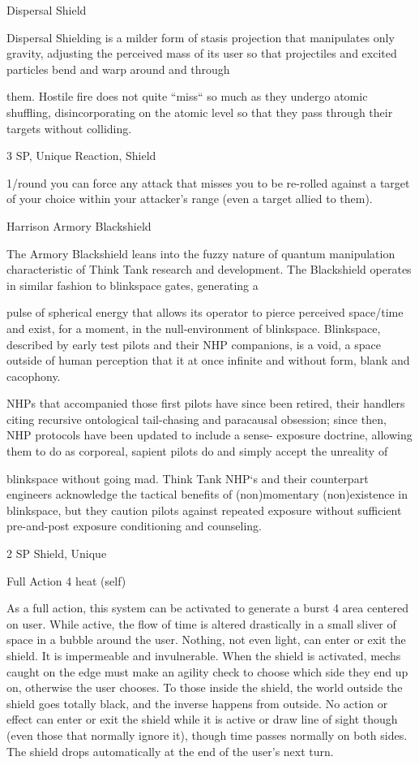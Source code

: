 Dispersal Shield  

Dispersal Shielding is a milder form of stasis projection that manipulates only gravity, adjusting the  
perceived mass of its user so that projectiles and excited particles bend and warp around and through  

                                                                                                                    


them. Hostile fire does not quite “miss“ so much as they undergo atomic shuffling, disincorporating on the  
atomic level so that they pass through their targets without colliding.   

3 SP, Unique  
Reaction, Shield
 
1/round you can force any attack that misses you to be re-rolled against a target of your choice  
within your attacker’s range (even a target allied to them).
 

Harrison Armory Blackshield  

The Armory Blackshield leans into the fuzzy nature of quantum manipulation characteristic of Think Tank  
research and development. The Blackshield operates in similar fashion to blinkspace gates, generating a  

pulse of spherical energy that allows its operator to pierce perceived space/time and exist, for a moment, in  
the null-environment of blinkspace. Blinkspace, described by early test pilots and their NHP companions, is  
a void, a space outside of human perception that it at once infinite and without form, blank and cacophony.  

NHPs that accompanied those first pilots have since been retired, their handlers citing recursive ontological  
tail-chasing and paracausal obsession; since then, NHP protocols have been updated to include a sense- 
exposure doctrine, allowing them to do as corporeal, sapient pilots do and simply accept the unreality of  

blinkspace without going mad. Think Tank NHP‘s and their counterpart engineers acknowledge the tactical  
benefits of (non)momentary (non)existence in blinkspace, but they caution pilots against repeated exposure  
without sufficient pre-and-post exposure conditioning and counseling.   

2 SP  
Shield, Unique  

Full Action  
4 heat (self)  

As a full action, this system can be activated to generate a burst 4 area centered on user. While  
active, the flow of time is altered drastically in a small sliver of space in a bubble around the user.  
Nothing, not even light, can enter or exit the shield. It is impermeable and invulnerable. When the  
shield is activated, mechs caught on the edge must make an agility check to choose which side  
they end up on, otherwise the user chooses. To those inside the shield, the world outside the  
shield goes totally black, and the inverse happens from outside. No action or effect can enter or  
exit the shield while it is active or draw line of sight though (even those that normally ignore it),  
though time passes normally on both sides. The shield drops automatically at the end of the  
user’s next turn.
 

